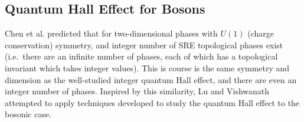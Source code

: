
\subsection{Quantum Hall Effect for Bosons}
\label{subsec::FQHEintro}

Chen et al. predicted that for two-dimensional phases with $U(1)$ (charge conservation) symmetry, and integer number of SRE topological phases exist (i.e.~there are an infinite number of phases, each of which has a topological invariant which takes integer values). This is course is the same symmetry and dimension as the well-studied integer quantum Hall effect, and there are even an integer number of phases. Inspired by this similarity, Lu and Vishwanath \cite{LuVishwanath} attempted to apply techniques developed to study the quantum Hall effect to the bosonic case.

